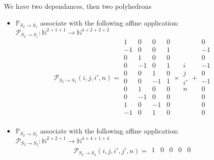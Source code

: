 We have two dependances, then two polyhedrons 
\begin{itemize}
	\item $\mathbb{P}_{S_{2} \rightarrow S_{1}}$ associate with the following affine application:\\
	$\mathcal{P}_{S_{2} \rightarrow S_{1}}: \mathbb{N}^{2 + 1 + 1} \rightarrow  \mathbb{N}^{4 + 2 + 2 + 2} $\\
	$$\mathcal{P}_{S_{2} \rightarrow S_{1}}(i, j, i', n) = 
	\begin{array}{cccc}
		1  & 0  & 0  & 0 \\
		-1 & 0  & 0  & 1 \\
		0  & 1  & 0  & 0 \\
		0  & -1 & 0  & 1 \\
		0  & 0  & 1  & 0 \\
		0  & 0  & -1 & 1 \\
		0  & 1  & 0  & 0 \\
		0  & -1 & 0  & 0 \\
		1  & 0  & -1 & 0 \\
		-1 & 0  & 1  & 0 \\
	\end{array}
	\times
	\begin{array}{c}
		i  \\
		j  \\
		i' \\
		n  \\
	\end{array}
	+
	\begin{array}{c}
		0  \\
		-1 \\
		0  \\
		-1 \\
		0  \\
		-1 \\
		0  \\
		0  \\
		0  \\
		0  \\
	\end{array}$$
	\item $\mathbb{P}_{S_{2} \rightarrow S_{2}}$ associate with the following affine application:\\
	$\mathcal{P}_{S_{2} \rightarrow S_{2}}: \mathbb{N}^{2 + 2 + 1} \rightarrow  \mathbb{N}^{4 + 4 + 1 + 4} $\\
	$$\mathcal{P}_{S_{2} \rightarrow S_{2}}(i, j, i', j', n) = 
	\begin{array}{ccccc}
		1  & 0  & 0  & 0  & 0  \\

\end{array}$$
\end{itemize}
